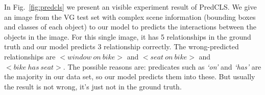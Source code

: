 In Fig.~\ref{fig:predcls} we present an visible experiment result of PredCLS. We give an image from the VG test set with complex scene information (bounding boxes and classes of each object) to our  model to predicts the interactions between the objects in the image. For this single image, it has 5 relationships in the ground truth and our model predicts 3 relationship correctly. The wrong-predicted relationships are $ <window\ on\ bike >$ and $<seat\ on\ bike>$ and $<bike\ has\ seat>$. The possible reasons are: predicates such as \textit{`on' }and \textit{`has' } are the majority in our data set, so our model predicts them into these. But usually the result is not wrong, it's just not in the ground truth.

\begin{figure}
	\centering
\end{figure}
